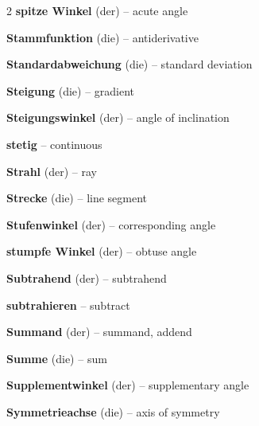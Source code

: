 \begin{multicols}{2}
\textbf{spitze Winkel} (der) -- acute angle\dotfill\hyperref[e:157]{\pageref*{e:157}}\par
\textbf{Stammfunktion} (die) -- antiderivative\dotfill\hyperref[e:285]{\pageref*{e:285}}\par
\textbf{Standardabweichung} (die) -- standard deviation\dotfill\hyperref[e:337]{\pageref*{e:337}}\par
\textbf{Steigung} (die) -- gradient\dotfill\hyperref[e:120]{\pageref*{e:120}}\par
\textbf{Steigungswinkel} (der) -- angle of inclination\dotfill\hyperref[e:310]{\pageref*{e:310}}\par
\textbf{stetig} -- continuous\dotfill\hyperref[e:268]{\pageref*{e:268}}\par
\textbf{Strahl} (der) -- ray\dotfill\hyperref[e:149]{\pageref*{e:149}}\par
\textbf{Strecke} (die) -- line segment\dotfill\hyperref[e:148]{\pageref*{e:148}}\par
\textbf{Stufenwinkel} (der) -- corresponding angle\dotfill\hyperref[e:167]{\pageref*{e:167}}\par
\textbf{stumpfe Winkel} (der) -- obtuse angle\dotfill\hyperref[e:159]{\pageref*{e:159}}\par
\textbf{Subtrahend} (der) -- subtrahend\dotfill\hyperref[e:20]{\pageref*{e:20}}\par
\textbf{subtrahieren} -- subtract\dotfill\hyperref[e:17]{\pageref*{e:17}}\par
\textbf{Summand} (der) -- summand, addend\dotfill\hyperref[e:16]{\pageref*{e:16}}\par
\textbf{Summe} (die) -- sum\dotfill\hyperref[e:15]{\pageref*{e:15}}\par
\textbf{Supplementwinkel} (der) -- supplementary angle\dotfill\hyperref[e:165]{\pageref*{e:165}}\par
\textbf{Symmetrieachse} (die) -- axis of symmetry\dotfill\hyperref[e:171]{\pageref*{e:171}}\par


\end{multicols}
